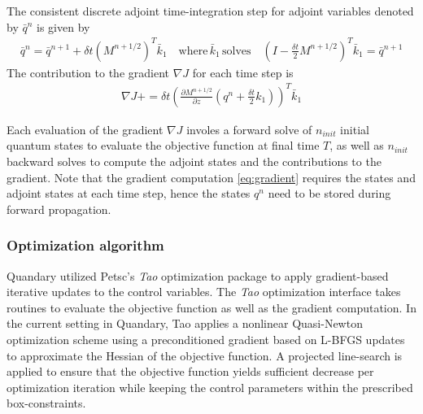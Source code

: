 \documentclass[11pt]{article}
\begin{document}
  The consistent discrete adjoint time-integration step for
    adjoint variables denoted by $\bar q^{n}$ is given by
   \begin{align}
      \bar q^{n} = \bar q^{n+1} + \delta t \left(M^{n+1/2}\right)^T \bar k_1
      \quad \text{where} \, \bar k_1 \, \text{solves} \quad \left(
      I-\frac{\delta t}{2} M^{n+1/2}\right)^T  \bar k_1 = \bar q^{n+1} 
    \end{align}
  The contribution to the gradient $\nabla J$ for each time step is
    \begin{align}\label{eq:gradient}
      \nabla J += \delta t \left( \frac{\partial M^{n+1/2}}{\partial z}
      \left(q^n + \frac{\delta t}{2} k_1\right) \right)^T\bar k_1
    \end{align}
  
    Each evaluation of the gradient $\nabla J$ involes a forward solve of $n_{init}$ initial quantum states to evaluate the objective function at final time $T$, as well as $n_{init}$ backward solves to compute the adjoint states and the contributions to the gradient. Note that the gradient computation \eqref{eq:gradient} requires the states and adjoint states at each time step, hence the states $q^n$ need to be stored during forward propagation. 



  \subsubsection{Optimization algorithm}
    Quandary utilized Petsc's \textit{Tao} optimization package to apply gradient-based iterative updates to the control variables. The \textit{Tao} optimization interface takes routines to evaluate the objective function as well as the gradient computation. In the current setting in Quandary, Tao applies a nonlinear Quasi-Newton optimization scheme using a preconditioned gradient based on L-BFGS updates to approximate the Hessian of the objective function. A projected line-search is applied to ensure that the objective function yields sufficient decrease per optimization iteration while keeping the control parameters within the prescribed box-constraints. 
\end{document}
